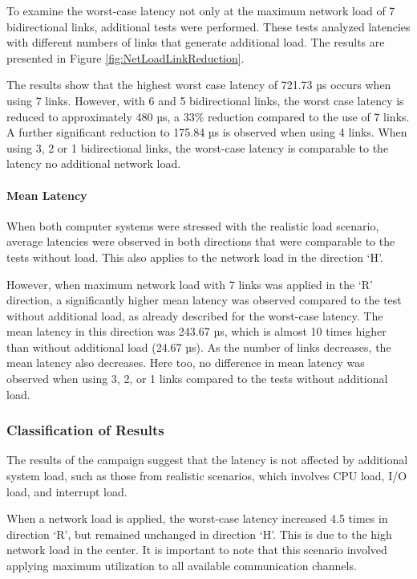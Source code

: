 To examine the worst-case latency not only at the maximum network load of 7 bidirectional links, additional tests were performed. These tests analyzed latencies with different numbers of links that generate additional load. The results are presented in Figure \ref{fig:NetLoadLinkReduction}.

The results show that the highest worst case latency of 721.73 µs occurs when using 7 links. However, with 6 and 5 bidirectional links, the worst case latency is reduced to approximately 480 µs, a 33\% reduction compared to the use of 7 links. A further significant reduction to 175.84 µs is observed when using 4 links. When using 3, 2 or 1 bidirectional links, the worst-case latency is comparable to the latency no additional network load.

\paragraph{Mean Latency}
When both computer systems were stressed with the realistic load scenario, average latencies were observed in both directions that were comparable to the tests without load. This also applies to the network load in the direction `H'.

However, when maximum network load with 7 links was applied in the `R' direction, a significantly higher mean latency was observed compared to the test without additional load, as already described for the worst-case latency. The mean latency in this direction was 243.67 µs, which is almost 10 times higher than without additional load (24.67 µs). As the number of links decreases, the mean latency also decreases. Here too, no difference in mean latency was observed when using 3, 2, or 1 links compared to the tests without additional load.

\subsubsection{Classification of Results}
The results of the campaign suggest that the latency is not affected by additional system load, such as those from realistic scenarios, which involves CPU load, I/O load, and interrupt load.

When a network load is applied, the worst-case latency increased 4.5 times in direction `R', but remained unchanged in direction `H'. This is due to the high network load in the center. It is important to note that this scenario involved applying maximum utilization to all available communication channels.

